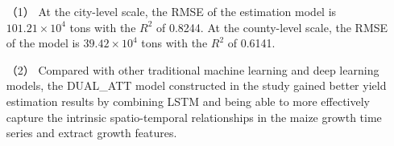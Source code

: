\begin{itemize}
  \item [（1）] At the city-level scale, the RMSE of the estimation model is $101.21\times 10^4$ tons with the $R^2$ of 0.8244. At the county-level scale, the RMSE of the model is $39.42\times 10^4$ tons with the $R^2$ of 0.6141.
  \item [（2）] Compared with other traditional machine learning and deep learning models, the DUAL\_ATT model constructed in the study gained better yield estimation results by combining LSTM and being able to more effectively capture the intrinsic spatio-temporal relationships in the maize growth time series and extract growth features.
\end{itemize}